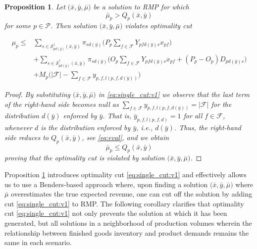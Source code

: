 \documentclass[12pt]{article}
\newtheorem{proposition}[theorem]{Proposition}%
\theoremstyle{thmstylethree}%
\newcommand{\mtc}[1] {\mathcal{#1}}
\begin{document}
\begin{proposition}\label{prop:oc:cut}
Let $\big(\bar{x},\bar{y},\bar{\mu}\big)$ be a solution to RMP for which 
$$\bar{\mu}_p > Q_{p}(\bar{x},\bar{y})$$
for some $p\in\mtc{P}$. Then solution $\big(\bar{x},\bar{y},\bar{\mu}\big)$ violates optimality cut 

\begin{align}
\label{eq:single_cut:v1}  \mu_p \leq & \sum_{s \in \mathcal{S}^{\downarrow}_{pd(\bar{y})}(\bar{x},\bar{y})} \pi_{sd(\bar{y})} \bigg(P_p \sum_{f \in \mathcal{F}}Y_{pfd(\bar{y})s}x_{pf} \bigg) \\ \nonumber & +\sum_{s \in \mathcal{S}^{\uparrow}_{pd(\bar{y})}(\bar{x},\bar{y})} \pi_{sd(\bar{y})}\bigg(O_p\sum_{f\in\mathcal{F}}Y_{pfd(\bar{y})s}x_{pf}+(P_p-O_p)D_{pd(\bar{y})s}\bigg)\\
    \nonumber  &+ M_{p}\bigg(\vert \mathcal{F} \vert - \sum_{f \in \mathcal{F}} y_{p,f,l(p,f,d(\bar{y}))}\bigg) 
\end{align}
\end{proposition}
\begin{proof}
  \itshape
By substituting $\big(\bar{x},\bar{y},\bar{\mu}\big)$ in \eqref{eq:single_cut:v1} we observe that the last term of the right-hand side becomes null as $\sum_{f \in \mathcal{F}} y_{p,f,l(p,f,d(\bar{y}))}=|\mathcal{F}|$ for the distribution $d(\bar{y})$ enforced by $\bar{y}$. That is, $\bar{y}_{p,f,l(p,f,d)}=1$ for all $f\in\mtc{F}$, whenever $d$ is the distribution enforced by $\bar{y}$, i.e., $d(\bar{y})$.
Thus, the right-hand side reduces to $Q_{p}(\bar{x},\bar{y})$, see \eqref{eq:eval}, and we obtain 
$$\bar{\mu}_p \leq Q_{p}(\bar{x},\bar{y})$$
proving that the optimality cut is violated by solution  $\big(\bar{x},\bar{y},\bar{\mu}\big)$. 
\end{proof}

Proposition \ref{prop:oc:cut} introduces optimality cut \eqref{eq:single_cut:v1} and effectively allows us to use a Benders-based approach where, upon finding a solution $\big(\bar{x},\bar{y},\bar{\mu}\big)$ where $\bar{\mu}$ overestimates the true expected revenue, one can cut off the solution by adding cut \eqref{eq:single_cut:v1} to RMP. The following corollary clarifies that optimality cut \eqref{eq:single_cut:v1} not only prevents the solution at which it has been generated, but all solutions in a neighborhood of production volumes wherein the relationship between finished goods inventory and product demands remains the same in each scenario. 
\end{document}
